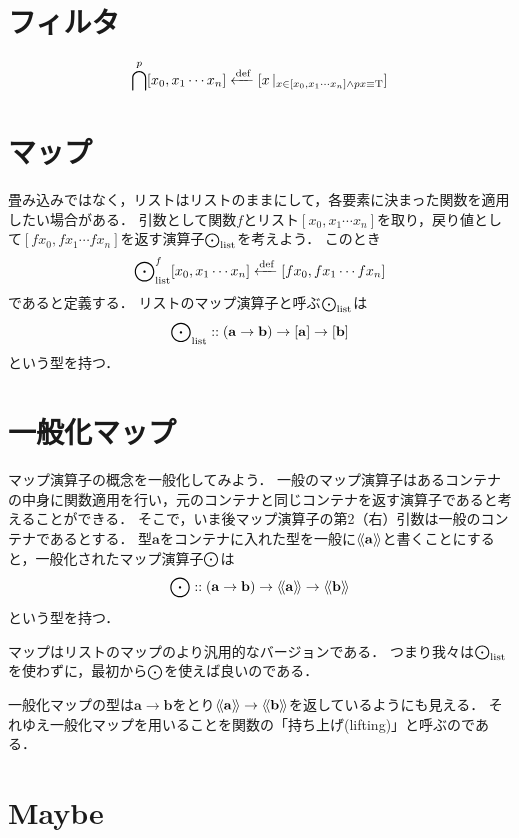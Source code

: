 \documentclass[twocolumn]{jsbook}
\newcommand{\typename}[1]{\mathbf{#1}}
\newcommand{\listtype}[1]{[#1]}
\newcommand{\guard}[1]{\mathop{\mid_{#1}}}
\begin{document}
\section{フィルタ}

$$\filterfunc^p\listtype{x_0,x_1\dotsb x_n}\defeq\listtype{x\guard{x\in\listtype{x_0,x_1\dotsb x_n}\wedge px\equiv\truevalue}}$$

\section{マップ}

畳み込みではなく，リストはリストのままにして，各要素に決まった関数を適用したい場合がある．
引数として関数$f$とリスト$[x_0,x_1\dotsb x_n]$を取り，戻り値として$[fx_0,fx_1\dotsb fx_n]$を返す演算子$\bigodot_\text{list}$を考えよう．
このとき$$\bigodot^f\nolimits_\text{list}[x_0,x_1\dotsb x_n]\xleftarrow{\text{def}} [fx_0,fx_1\dotsb fx_n]$$であると定義する．
リストのマップ演算子と呼ぶ$\bigodot_\text{list}$は$$\mapfunc\nolimits_\text{list}::(\typename{a}\rightarrow\typename{b})\rightarrow\listtype{\typename{a}}\rightarrow\listtype{\typename{b}}$$という型を持つ．


\section{一般化マップ}

マップ演算子の概念を一般化してみよう．
一般のマップ演算子はあるコンテナの中身に関数適用を行い，元のコンテナと同じコンテナを返す演算子であると考えることができる．
そこで，いま後マップ演算子の第2（右）引数は一般のコンテナであるとする．
型$\typename{a}$をコンテナに入れた型を一般に$\generalcontainer{\typename{a}}$と書くことにすると，一般化されたマップ演算子$\bigodot$は$$\mapfunc::(\typename{a}\rightarrow\typename{b})\rightarrow\generalcontainer{\typename{a}}\rightarrow\generalcontainer{\typename{b}}$$という型を持つ．

マップはリストのマップのより汎用的なバージョンである．
つまり我々は$\bigodot_\text{list}$を使わずに，最初から$\bigodot$を使えば良いのである．

一般化マップの型は$\typename{a}\rightarrow\typename{b}$をとり$\generalcontainer{\typename{a}}\rightarrow\generalcontainer{\typename{b}}$を返しているようにも見える．
それゆえ一般化マップを用いることを関数の「持ち上げ(lifting)」と呼ぶのである．

\section{Maybe}
\end{document}
